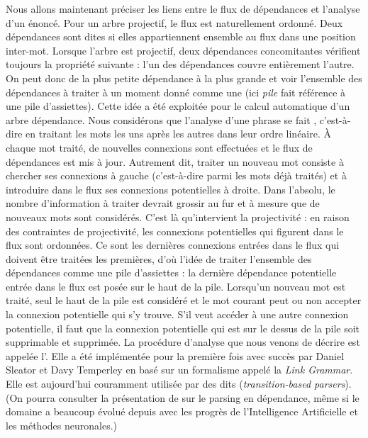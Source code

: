 {    Nous allons maintenant préciser les liens entre le flux de dépendances et l’analyse d’un énoncé. Pour un arbre projectif, le flux est naturellement ordonné. Deux dépendances sont dites  si elles appartiennent ensemble au flux dans une position inter-mot. Lorsque l’arbre est projectif, deux dépendances concomitantes vérifient toujours la propriété suivante : l’un des dépendances couvre entièrement l’autre. On peut donc  de la plus petite dépendance à la plus grande et voir l’ensemble des dépendances à traiter à un moment donné comme une  (ici \textit{pile} fait référence à une pile d’assiettes). Cette idée a été exploitée pour le calcul automatique d’un arbre dépendance. Nous considérons que l’analyse d’une phrase se fait , c’est-à-dire en traitant les mots les uns après les autres dans leur ordre linéaire. À chaque mot traité, de nouvelles connexions sont effectuées et le flux de dépendances est mis à jour. Autrement dit, traiter un nouveau mot consiste à chercher ses connexions à gauche (c’est-à-dire parmi les mots déjà traités) et à introduire dans le flux ses connexions potentielles à droite. Dans l’absolu, le nombre d’information à traiter devrait grossir au fur et à mesure que de nouveaux mots sont considérés. C’est là qu’intervient la projectivité : en raison des contraintes de projectivité, les connexions potentielles qui figurent dans le flux sont ordonnées. Ce sont les dernières connexions entrées dans le flux qui doivent être traitées les premières, d’où l’idée de traiter l’ensemble des dépendances comme une pile d’assiettes : la dernière dépendance potentielle entrée dans le flux est posée sur le haut de la pile. Lorsqu’un nouveau mot est traité, seul le haut de la pile est considéré et le mot courant peut ou non accepter la connexion potentielle qui s’y trouve. S’il veut accéder à une autre connexion potentielle, il faut que la connexion potentielle qui est sur le dessus de la pile soit supprimable et supprimée. La procédure d’analyse que nous venons de décrire est appelée l’. Elle a été implémentée pour la première fois avec succès par Daniel Sleator et Davy Temperley en \citeyear{sleator1993parsing} basé sur un formalisme appelé la \textit{Link Grammar}. Elle est aujourd'hui couramment utilisée par des  dits  (\textit{transition-based parsers}). (On pourra consulter la présentation de \citet{kubler2009dependency} sur le parsing en dépendance, même si le domaine a beaucoup évolué depuis avec les progrès de l'Intelligence Artificielle et les méthodes neuronales.)

}
